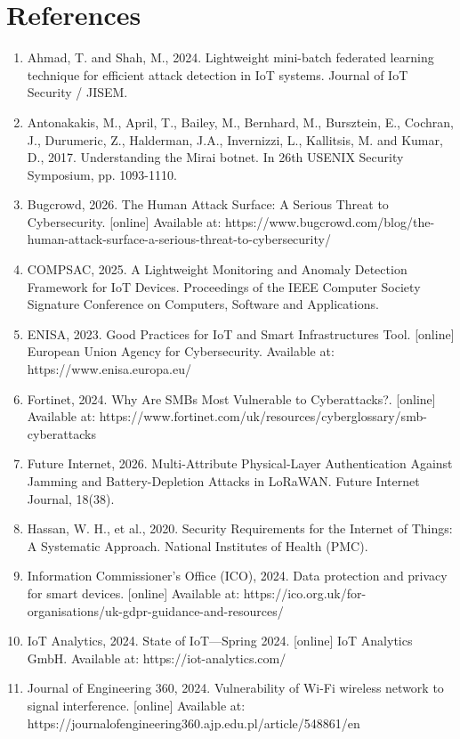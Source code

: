 \chapter*{References}

\begin{enumerate}
  \item Ahmad, T. and Shah, M., 2024. Lightweight mini-batch federated learning technique for efficient attack detection in IoT systems. Journal of IoT Security / JISEM.
  \item Antonakakis, M., April, T., Bailey, M., Bernhard, M., Bursztein, E., Cochran, J., Durumeric, Z., Halderman, J.A., Invernizzi, L., Kallitsis, M. and Kumar, D., 2017. Understanding the Mirai botnet. In 26th USENIX Security Symposium, pp. 1093-1110.
  \item Bugcrowd, 2026. The Human Attack Surface: A Serious Threat to Cybersecurity. [online] Available at: https://www.bugcrowd.com/blog/the-human-attack-surface-a-serious-threat-to-cybersecurity/
  \item COMPSAC, 2025. A Lightweight Monitoring and Anomaly Detection Framework for IoT Devices. Proceedings of the IEEE Computer Society Signature Conference on Computers, Software and Applications.
  \item ENISA, 2023. Good Practices for IoT and Smart Infrastructures Tool. [online] European Union Agency for Cybersecurity. Available at: https://www.enisa.europa.eu/
  \item Fortinet, 2024. Why Are SMBs Most Vulnerable to Cyberattacks?. [online] Available at: https://www.fortinet.com/uk/resources/cyberglossary/smb-cyberattacks
  \item Future Internet, 2026. Multi-Attribute Physical-Layer Authentication Against Jamming and Battery-Depletion Attacks in LoRaWAN. Future Internet Journal, 18(38).
  \item Hassan, W. H., et al., 2020. Security Requirements for the Internet of Things: A Systematic Approach. National Institutes of Health (PMC).
  \item Information Commissioner's Office (ICO), 2024. Data protection and privacy for smart devices. [online] Available at: https://ico.org.uk/for-organisations/uk-gdpr-guidance-and-resources/
  \item IoT Analytics, 2024. State of IoT---Spring 2024. [online] IoT Analytics GmbH. Available at: https://iot-analytics.com/
  \item Journal of Engineering 360, 2024. Vulnerability of Wi-Fi wireless network to signal interference. [online] Available at: https://journalofengineering360.ajp.edu.pl/article/548861/en

\end{enumerate}
